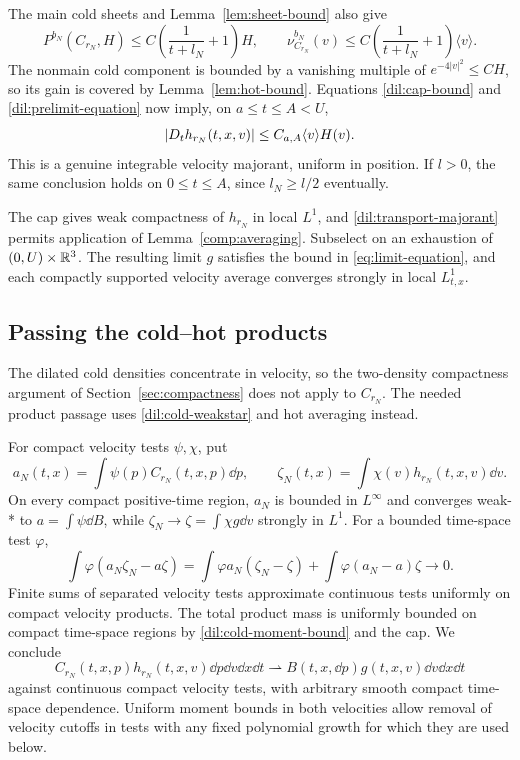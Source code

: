 The main cold sheets and Lemma~\ref{lem:sheet-bound} also give
\[
P^{b_N}(C_{r_N},H)\leq
 C\left(\frac1{t+l_N}+1\right)H,
\qquad
\nu^{b_N}_{C_{r_N}}(v)\leq
 C\left(\frac1{t+l_N}+1\right)\langle v\rangle.
\]
The nonmain cold component is bounded by a vanishing multiple of
\(e^{-4|v|^2}\leq CH\), so its gain is covered by
Lemma~\ref{lem:hot-bound}. Equations \eqref{dil:cap-bound} and
\eqref{dil:prelimit-equation} now imply, on \(a\leq t\leq A<U\),
\begin{equation}\label{dil:transport-majorant}
|D_t h_{r_N}(t,x,v)|\leq C_{a,A}\langle v\rangle H(v).
\end{equation}
This is a genuine integrable velocity majorant, uniform in position.
If \(l>0\), the same conclusion holds on \(0\leq t\leq A\), since
\(l_N\geq l/2\) eventually.

The cap gives weak compactness of \(h_{r_N}\) in local \(L^1\),
and \eqref{dil:transport-majorant} permits application of
Lemma~\ref{comp:averaging}. Subselect on an exhaustion of
\((0,U)\times\mathbb R^3\). The resulting limit \(g\) satisfies the
bound in \eqref{eq:limit-equation}, and each compactly supported
velocity average converges strongly in local \(L^1_{t,x}\).

\subsection{Passing the cold--hot products}

The dilated cold densities concentrate in velocity, so the
two-density compactness argument of Section~\ref{sec:compactness}
does not apply to \(C_{r_N}\). The needed product passage uses
\eqref{dil:cold-weakstar} and hot averaging instead.

For compact velocity tests \(\psi,\chi\), put
\[
a_N(t,x)=\int\psi(p)C_{r_N}(t,x,p)\dd p,\qquad
\zeta_N(t,x)=\int\chi(v)h_{r_N}(t,x,v)\dd v.
\]
On every compact positive-time region, \(a_N\) is bounded in
\(L^\infty\) and converges weak-* to
\(a=\int\psi\dd B\), while
\(\zeta_N\to\zeta=\int\chi g\dd v\)
strongly in \(L^1\). For a bounded time-space test \(\varphi\),
\[
\int\varphi(a_N\zeta_N-a\zeta)
=\int\varphi a_N(\zeta_N-\zeta)
 +\int\varphi(a_N-a)\zeta\longrightarrow0.
\]
Finite sums of separated velocity tests approximate continuous tests
uniformly on compact velocity products. The total product mass is
uniformly bounded on compact time-space regions by
\eqref{dil:cold-moment-bound} and the cap. We conclude
\begin{equation}\label{dil:mixed-product}
C_{r_N}(t,x,p)h_{r_N}(t,x,v)\dd p\dd v\dd x\dd t
\rightharpoonup B(t,x,\dd p)g(t,x,v)\dd v\dd x\dd t
\end{equation}
against continuous compact velocity tests, with arbitrary smooth
compact time-space dependence. Uniform moment bounds in both velocities
allow removal of velocity cutoffs in tests with any fixed polynomial
growth for which they are used below.

